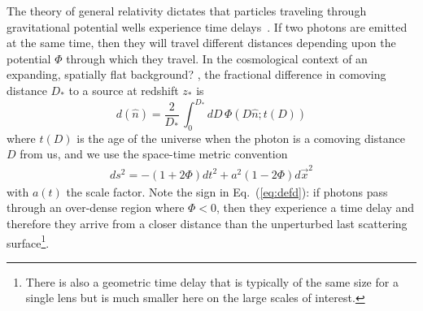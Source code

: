 \documentclass[prl,amsmath,amssymb,floatfix,superscriptaddress,nofootinbib,twocolumn]{revtex4-1}
\def\be{\begin{equation}}
\def\ee{\end{equation}}
\def\bea{\begin{eqnarray}}
\def\eea{\end{eqnarray}}
\newcommand{\ec}[1]{Eq.~(\ref{eq:#1})}
\newcommand{\eql}[1]{\label{eq:#1}}
\newcommand{\wh}[1]{{\color{red} #1}}
\begin{document}
The theory of general relativity dictates that particles traveling through gravitational potential wells experience time delays~\cite{1964PhRvL..13..789S}. If two photons are emitted at the same time, then they will travel different distances depending upon the potential $\Phi$ through which they travel. In the cosmological context of an expanding,  spatially flat background?
, the %
fractional difference in comoving distance
$D_*$ to a source at redshift $z_*$ is 
\be
d(\hat n) = \frac{2}{D_*}\, \int_0^{D_*} dD\, \Phi\left(D \hat n; t(D)\right)\eql{defd}
\ee
where %
$t(D)$ is the age of the universe when the photon is a comoving distance $D$ from us, and  we use the space-time metric convention 
\bea
ds^{2}= -(1+2\Phi)dt^{2}+a^{2}(1-2\Phi)d\vec{x}^{2}
\eea
with $a(t)$ the scale factor.
Note the sign in \ec{defd}: if photons pass through an over-dense region where $\Phi<0$, then they experience a time delay and therefore they arrive from a closer distance than the unperturbed last scattering surface\footnote{There is also a geometric time delay that is typically of the same size for a single lens but is much smaller here on the large scales of interest.}. %
\end{document}

